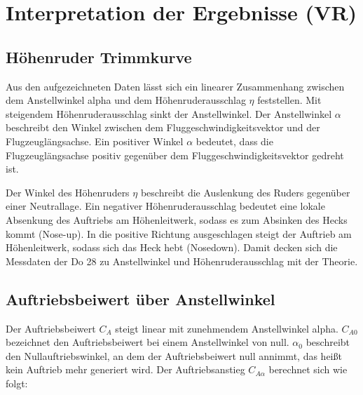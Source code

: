 \chapter{Interpretation der Ergebnisse (VR)}

\section{Höhenruder Trimmkurve}

Aus den aufgezeichneten Daten lässt sich ein linearer Zusammenhang zwischen dem Anstellwinkel alpha und dem 
Höhenruderausschlag $\eta$ feststellen. Mit steigendem Höhenruderausschlag sinkt der Anstellwinkel. 
Der Anstellwinkel $\alpha$ beschreibt den Winkel zwischen dem Fluggeschwindigkeitsvektor und der Flugzeuglängsachse. Ein positiver Winkel $\alpha$ bedeutet, dass die Flugzeuglängsachse positiv gegenüber dem Fluggeschwindigkeitsvektor gedreht ist. 



Der Winkel des Höhenruders $\eta$ beschreibt die Auslenkung des Ruders gegenüber einer Neutrallage. Ein negativer 
Höhenruderausschlag bedeutet eine lokale Absenkung des Auftriebs am Höhenleitwerk, sodass es zum Absinken des Hecks kommt (Nose-up). In die positive Richtung ausgeschlagen steigt der Auftrieb am Höhenleitwerk, sodass sich das Heck hebt (Nosedown). 
Damit decken sich die Messdaten der Do 28 zu Anstellwinkel und Höhenruderausschlag mit der Theorie.




\section{Auftriebsbeiwert über Anstellwinkel}

Der Auftriebsbeiwert $C_A$ steigt linear mit zunehmendem Anstellwinkel alpha. $C_{A0}$ bezeichnet den Auftriebsbeiwert bei einem Anstellwinkel von null. $\alpha_0$ beschreibt den Nullauftriebswinkel, an dem der Auftriebsbeiwert null annimmt, das heißt kein Auftrieb mehr generiert wird. Der Auftriebsanstieg $C_{A\alpha}$ berechnet sich wie folgt:

